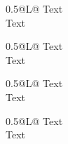 \documentclass{article}
\makeatletter
\newcommand{\tableforloop}{%
	\begin{tabulary}{0.5\textwidth}{@{}L@{}}
	Text\\
	Text\\[2ex]
	\end{tabulary}%
}
\makeatother
\begin{document}
\tableforloop \tableforloop \tableforloop \tableforloop
\end{document}

